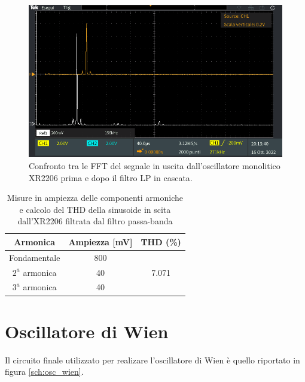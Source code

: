 \documentclass[titlepage]{report}
\begin{document}
	\begin{figure}[H]
		\centering
		\includegraphics[scale=0.5]{Immagini/fft_xr+lp.PNG}
		\caption{Confronto tra le FFT del segnale in uscita dall'oscillatore monolitico XR2206 prima e dopo il filtro LP in cascata.}
		\label{fig:FFTxr+LP}
	\end{figure}


	\begin{table}[h!]
		\centering
		\begin{tabular}{||c|c|c||}
			\hline
			\cellcolor{gray!10}Armonica & \cellcolor{gray!10}Ampiezza [mV] & \cellcolor{gray!10}THD (\%) \\
			\hline
			Fondamentale & 800 &\\
			\cline{1-2}
			$2^a$ armonica & 40 & 7.071 \\
			\cline{1-2} 
			$3^a$ armonica & 40 & \\
			\hline	
		\end{tabular}
		\caption{Misure in ampiezza delle componenti armoniche e calcolo del THD della sinusoide in scita dall'XR2206 filtrata dal filtro passa-banda}
		\label{tab:THD_XR2206+BP}
	\end{table}

\newpage
\section{Oscillatore di Wien}

Il circuito finale utilizzato per realizare l'oscillatore di Wien è quello riportato in figura \ref{sch:osc_wien}.
\end{document}

